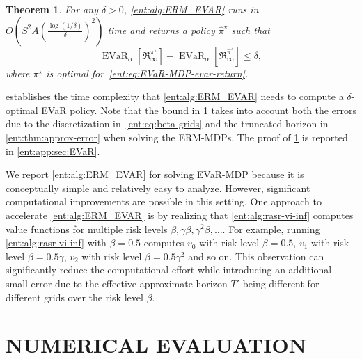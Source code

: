 \documentclass[twoside]{article}
\newcommand{\opt}{^\star}
\newcommand{\evar}[2]{\operatorname{EVaR}_{#1} \left[#2\right]}
\theoremstyle{plain}
\newtheorem{theorem}{Theorem}[section]
\theoremstyle{definition}
\theoremstyle{remark}
\begin{document}
\begin{theorem} \label{ent:thm:rasr-evar-bound}
For any $\delta > 0$, \cref{ent:alg:ERM_EVAR} runs in $O(S^2 A (\frac{\log(1/\delta)}{\delta})^2)$ time and returns a policy $\hat{\pi}\opt$ such that
%
\begin{equation*}
\evar{\alpha}{ \mathfrak{R}_{\infty}^{\pi\opt} } - \evar{\alpha}{ \mathfrak{R}_{\infty}^{\hat{\pi}\opt} } \le \delta,
\end{equation*}
%
where $\pi\opt$ is optimal for~\eqref{ent:eq:EVaR-MDP-evar-return}.
\end{theorem}

 establishes the time complexity that \cref{ent:alg:ERM_EVAR} needs to compute a $\delta$-optimal EVaR policy. Note that the bound in \cref{ent:thm:rasr-evar-bound} takes into account both the errors due to the discretization in~\eqref{ent:eq:beta-grids} and the truncated horizon in \cref{ent:thm:approx-error} when solving the ERM-MDPs. The proof of \cref{ent:thm:rasr-evar-bound} is reported in \cref{ent:app:sec:EVaR}. 

We report \cref{ent:alg:ERM_EVAR} for solving EVaR-MDP because it is conceptually simple and relatively easy to analyze. However, significant computational improvements are possible in this setting. One approach to accelerate \cref{ent:alg:ERM_EVAR} is by realizing that \cref{ent:alg:rasr-vi-inf} computes value functions for multiple risk levels $\beta,\gamma\beta,\gamma^2\beta,\ldots$. For example, running \cref{ent:alg:rasr-vi-inf} with $\beta = 0.5$ computes $v_0$ with risk level $\beta=0.5$, $v_1$ with risk level $\beta=0.5\gamma$, $v_2$ with risk level $\beta=0.5\gamma ^2$ and so on. This observation can significantly reduce the computational effort while introducing an additional small error due to the effective approximate horizon $T'$ being different for different grids over the risk level $\beta$. 


\section{NUMERICAL EVALUATION}
\label{ent:sec:empirical}
\end{document}
